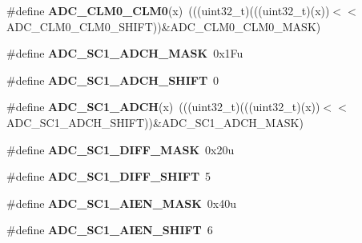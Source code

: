 \begin{DoxyCompactItemize}
\item 
\#define {\bfseries A\+D\+C\+\_\+\+C\+L\+M0\+\_\+\+C\+L\+M0}(x)~(((uint32\+\_\+t)(((uint32\+\_\+t)(x))$<$$<$A\+D\+C\+\_\+\+C\+L\+M0\+\_\+\+C\+L\+M0\+\_\+\+S\+H\+I\+FT))\&A\+D\+C\+\_\+\+C\+L\+M0\+\_\+\+C\+L\+M0\+\_\+\+M\+A\+SK)\hypertarget{group__ADC__Register__Masks_ga388deb317a8fa21fa77fc0d5df262966}{}\label{group__ADC__Register__Masks_ga388deb317a8fa21fa77fc0d5df262966}

\item 
\#define {\bfseries A\+D\+C\+\_\+\+S\+C1\+\_\+\+A\+D\+C\+H\+\_\+\+M\+A\+SK}~0x1\+Fu\hypertarget{group__ADC__Register__Masks_ga7450ced3c2b2df20023c2152f1470640}{}\label{group__ADC__Register__Masks_ga7450ced3c2b2df20023c2152f1470640}

\item 
\#define {\bfseries A\+D\+C\+\_\+\+S\+C1\+\_\+\+A\+D\+C\+H\+\_\+\+S\+H\+I\+FT}~0\hypertarget{group__ADC__Register__Masks_gab2ba46d5132224f2920c1881e2c1b6fe}{}\label{group__ADC__Register__Masks_gab2ba46d5132224f2920c1881e2c1b6fe}

\item 
\#define {\bfseries A\+D\+C\+\_\+\+S\+C1\+\_\+\+A\+D\+CH}(x)~(((uint32\+\_\+t)(((uint32\+\_\+t)(x))$<$$<$A\+D\+C\+\_\+\+S\+C1\+\_\+\+A\+D\+C\+H\+\_\+\+S\+H\+I\+FT))\&A\+D\+C\+\_\+\+S\+C1\+\_\+\+A\+D\+C\+H\+\_\+\+M\+A\+SK)\hypertarget{group__ADC__Register__Masks_gab2ec3f01d5b560d3f839439b038f3981}{}\label{group__ADC__Register__Masks_gab2ec3f01d5b560d3f839439b038f3981}

\item 
\#define {\bfseries A\+D\+C\+\_\+\+S\+C1\+\_\+\+D\+I\+F\+F\+\_\+\+M\+A\+SK}~0x20u\hypertarget{group__ADC__Register__Masks_gadc514fb491cf08eb3fb0f27298388645}{}\label{group__ADC__Register__Masks_gadc514fb491cf08eb3fb0f27298388645}

\item 
\#define {\bfseries A\+D\+C\+\_\+\+S\+C1\+\_\+\+D\+I\+F\+F\+\_\+\+S\+H\+I\+FT}~5\hypertarget{group__ADC__Register__Masks_ga1385c936a9440856068dcb917ed9c658}{}\label{group__ADC__Register__Masks_ga1385c936a9440856068dcb917ed9c658}

\item 
\#define {\bfseries A\+D\+C\+\_\+\+S\+C1\+\_\+\+A\+I\+E\+N\+\_\+\+M\+A\+SK}~0x40u\hypertarget{group__ADC__Register__Masks_gaa698d898e077003de10a42184de8f124}{}\label{group__ADC__Register__Masks_gaa698d898e077003de10a42184de8f124}

\item 
\#define {\bfseries A\+D\+C\+\_\+\+S\+C1\+\_\+\+A\+I\+E\+N\+\_\+\+S\+H\+I\+FT}~6\hypertarget{group__ADC__Register__Masks_gaf2cde8fb207dd348e6313d6d0a5b3761}{}\label{group__ADC__Register__Masks_gaf2cde8fb207dd348e6313d6d0a5b3761}


\end{DoxyCompactItemize}
